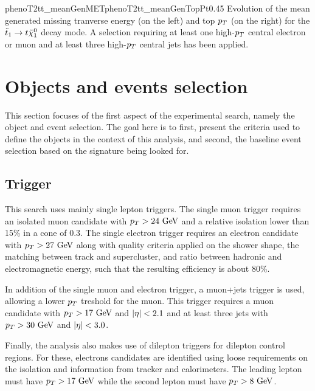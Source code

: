                      {phenoT2tt_meanGenMET}{phenoT2tt_meanGenTopPt}{0.45}
                     {Evolution of the mean generated missing tranverse energy (on the left) and top $p_T$
                     (on the right) for the $\tilde{t}_1 \rightarrow t \tilde{\chi}_1^0$ decay mode. A selection requiring
                     at least one high-$p_T$ central electron or muon and at least three high-$p_T$ central jets
                     has been applied.}

    \section{Objects and events selection \label{sec:analysis_objectAndEventSelection}}

    This section focuses of the first aspect of the experimental search, namely the object and event selection. 
    The goal here is to first, present the criteria used to define the objects in the context of this analysis,
    and second, the baseline event selection based on the signature being looked for.

        \subsection{Trigger}

    
    This search uses mainly single lepton triggers. The single muon trigger requires an isolated muon candidate
    with $p_T > 24 ~\text{GeV}$ and a relative isolation lower than 15\% in a cone of 0.3. The single electron trigger
    requires an electron candidate with $p_T > 27 ~\text{GeV}$ along with quality criteria applied on the shower shape,
    the matching between track and supercluster, and ratio between hadronic and electromagnetic energy, such that
    the resulting efficiency is about 80\%.

    In addition of the single muon and electron trigger, a muon+jets trigger is used, allowing a lower $p_T$ treshold
    for the muon. This trigger requires a muon candidate with $p_T > 17 ~\text{GeV}$ and $\left| \eta \right| < 2.1$ and at least three 
    jets with $p_T > 30 ~\text{GeV}$ and $\left| \eta \right| < 3.0$.

    Finally, the analysis also makes use of dilepton triggers for dilepton control regions. For these, electrons
    candidates are identified using loose requirements on the isolation and information from tracker and calorimeters.
    The leading lepton must have $p_T > 17 ~\text{GeV}$ while the second lepton must have $p_T > 8 ~\text{GeV}$.

